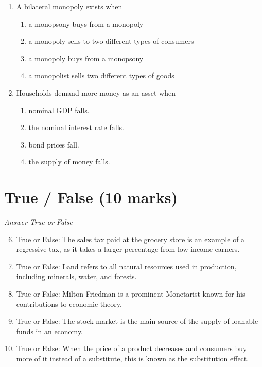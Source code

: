 \documentclass[12pt]{article}
\begin{document}
\begin{enumerate}[label=\arabic*.]
\item A bilateral monopoly exists when
\begin{enumerate}[label=(\alph*)]
    \item a monopsony buys from a monopoly
    \item a monopoly sells to two different types of consumers
    \item a monopoly buys from a monopsony
    \item a monopolist sells two different types of goods
\end{enumerate}
\item Households demand more money as an asset when
\begin{enumerate}[label=(\alph*)]
    \item nominal GDP falls.
    \item the nominal interest rate falls.
    \item bond prices fall.
    \item the supply of money falls.
\end{enumerate}
\end{enumerate}

\section*{True / False (10 marks)}
\textit{Answer True or False}
\begin{enumerate}[label=\arabic*.]
\setcounter{enumi}{5}
\item True or False: The sales tax paid at the grocery store is an example of a regressive tax, as it takes a larger percentage from low-income earners.
\item True or False: Land refers to all natural resources used in production, including minerals, water, and forests.
\item True or False: Milton Friedman is a prominent Monetarist known for his contributions to economic theory.
\item True or False: The stock market is the main source of the supply of loanable funds in an economy.
\item True or False: When the price of a product decreases and consumers buy more of it instead of a substitute, this is known as the substitution effect.
\end{enumerate}
\end{document}

